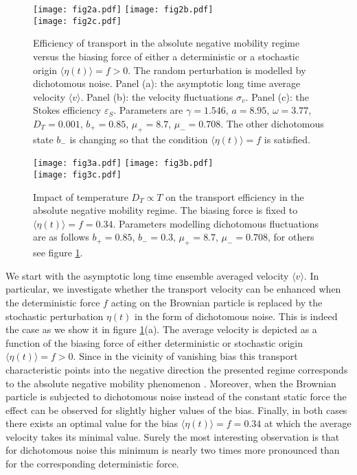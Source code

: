 \documentclass[12pt]{iopart}
\begin{document}
\begin{figure}[t]
	\centering
	\texttt{[image: fig2a.pdf]}
	\texttt{[image: fig2b.pdf]}\\
	\texttt{[image: fig2c.pdf]}
	\caption{Efficiency of transport in the absolute negative mobility regime versus the biasing force of either a deterministic or a stochastic origin $\langle \eta(t) \rangle = f > 0$. The random perturbation is modelled by dichotomous noise. Panel (a): the asymptotic long time average velocity $\langle v \rangle$. Panel (b): the velocity fluctuations $\sigma_v$. Panel (c): the Stokes efficiency $\varepsilon_S$. Parameters are $\gamma = 1.546$, $a = 8.95$, $\omega = 3.77$, $D_T = 0.001$, $b_+ = 0.85$, $\mu_+ = 8.7$, $\mu_- = 0.708$. The other dichotomous state $b_-$ is changing so that the condition $\langle \eta(t) \rangle = f$ is satisfied.}
	\label{fig2}
\end{figure}
\begin{figure}[t]
	\centering
	\texttt{[image: fig3a.pdf]}
	\texttt{[image: fig3b.pdf]}\\
	\texttt{[image: fig3c.pdf]}
	\caption{Impact of temperature $D_T \propto T$ on the transport efficiency in the absolute negative mobility regime. The biasing force is fixed to $\langle \eta(t) \rangle = f = 0.34$. Parameters modelling dichotomous fluctuations are as follows $b_+ = 0.85$, $b_- = 0.3$, $\mu_+ = 8.7$, $\mu_- = 0.708$, for others see figure \ref{fig2}.}
	\label{fig3}
\end{figure}
We start with the asymptotic long time ensemble averaged velocity $\langle v \rangle$. In particular, we investigate whether the transport velocity can be enhanced when the deterministic force $f$ acting on the Brownian particle is replaced by the stochastic perturbation $\eta(t)$ in the form of dichotomous noise. This is indeed the case as we show it in figure \ref{fig2}(a). The average velocity is depicted as a function of the biasing force of either deterministic or stochastic origin $\langle \eta(t) \rangle = f > 0$. Since in the vicinity of vanishing bias this transport characteristic points into the negative direction the presented regime corresponds to the absolute negative mobility phenomenon \cite{MacKos2007}. 
Moreover, when the Brownian particle is subjected to  dichotomous noise instead of the constant static force the effect can be observed for slightly higher values of the bias. 
Finally, in both cases there exists an optimal value for the bias $\langle \eta(t) \rangle = f = 0.34$ at which the average velocity takes its minimal value. Surely the most interesting observation is that for dichotomous noise this minimum is 
nearly two times more pronounced than for the corresponding deterministic force.
\end{document}
